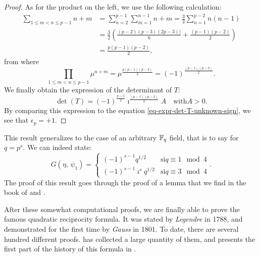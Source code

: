 \begin{proof}
As for the product on the left, we use the following calculation:
\begin{align*}
\sum_{1 \leq m <n \leq p-1}{n + m} & = \sum_{n = 2}^{p-1}{\sum_{m = 1}^{n-1}{n + m}} = \frac{3}{2} \sum_{n = 1}^{p-2}{n (n-1)} \\
& = \frac{3}{2} \left(\frac{(p-2) (p-3) (2p-3))}{6} + \frac{(p-1) (p-2) }{2} \right) \\
& = \frac{p (p-1) (p-2)}{2},
\end{align*}
from where
\begin{equation*}
\prod_{1 \leq m <n \leq p-1}{\mu^{n + m}} = \mu^{\frac{p (p-1) (p-2)}{2}} = (-1)^{\frac{(p-1) (p-2)}{2}}.
\end{equation*}
We finally obtain the expression of the determinant of $ T $:
\begin{equation*}
\det (T) = (-1)^{\frac{p-1}{2}} \imath^{\frac{(p-1) (p-2)}{2}} A \quad \text{with} A> 0.
\end{equation*}
By comparing this expression to the equation \eqref{eq-expr-det-T-unknown-sign}, we see that $ \epsilon_p = + 1 $.
\end{proof}
 
 
\begin{rem}
This result generalizes to the case of an arbitrary $ \mathbb{F}_q $ field, that is to say for $ q = p^s $. We can indeed state:
\begin{equation*}
G (\eta, \, \psi_1) = \left\{\begin{array}{ll} (-1)^{s-1} q^{1/2} & \text{si} q \equiv 1 \mod{4} \\(-1)^{s-1} \imath^sq^{1/2} & \text{si} q \equiv 3 \mod{4} \end{array} \right. .
\end{equation*}
The proof of this result goes through the proof of a lemma that we find in the book of  and  \cite{lidl}.
\end{rem}
  After these somewhat computational proofs, we are finally able to prove the famous quadratic reciprocity formula. It was stated by \textit{Legendre} in 1788, and demonstrated for the first time by \textit{Gauss} in 1801. To date, there are several hundred different proofs.  has collected a large quantity of them, and presents the first part of the history of this formula in \cite{lemmermeyer}.
 
